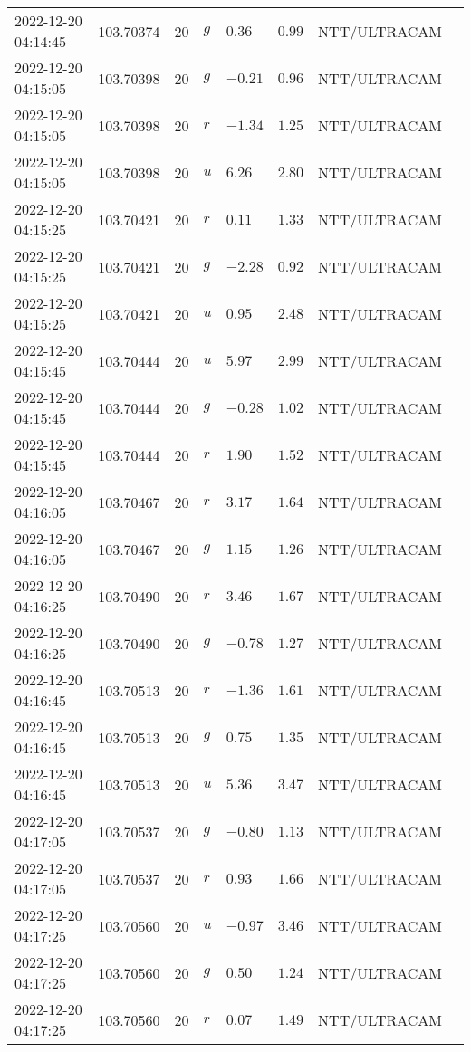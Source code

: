 \documentclass{nature_plusfigure}
\begin{document}
\begin{supplement}
\begin{center}
\begin{longtable}{llllllll}
2022-12-20 04:14:45 & 103.70374 & 20 & $g$ & $0.36$ & $0.99$ & NTT/ULTRACAM &  \\ 
2022-12-20 04:15:05 & 103.70398 & 20 & $g$ & $-0.21$ & $0.96$ & NTT/ULTRACAM &  \\ 
2022-12-20 04:15:05 & 103.70398 & 20 & $r$ & $-1.34$ & $1.25$ & NTT/ULTRACAM &  \\ 
2022-12-20 04:15:05 & 103.70398 & 20 & $u$ & $6.26$ & $2.80$ & NTT/ULTRACAM &  \\ 
2022-12-20 04:15:25 & 103.70421 & 20 & $r$ & $0.11$ & $1.33$ & NTT/ULTRACAM &  \\ 
2022-12-20 04:15:25 & 103.70421 & 20 & $g$ & $-2.28$ & $0.92$ & NTT/ULTRACAM &  \\ 
2022-12-20 04:15:25 & 103.70421 & 20 & $u$ & $0.95$ & $2.48$ & NTT/ULTRACAM &  \\ 
2022-12-20 04:15:45 & 103.70444 & 20 & $u$ & $5.97$ & $2.99$ & NTT/ULTRACAM &  \\ 
2022-12-20 04:15:45 & 103.70444 & 20 & $g$ & $-0.28$ & $1.02$ & NTT/ULTRACAM &  \\ 
2022-12-20 04:15:45 & 103.70444 & 20 & $r$ & $1.90$ & $1.52$ & NTT/ULTRACAM &  \\ 
2022-12-20 04:16:05 & 103.70467 & 20 & $r$ & $3.17$ & $1.64$ & NTT/ULTRACAM &  \\ 
2022-12-20 04:16:05 & 103.70467 & 20 & $g$ & $1.15$ & $1.26$ & NTT/ULTRACAM &  \\ 
2022-12-20 04:16:25 & 103.70490 & 20 & $r$ & $3.46$ & $1.67$ & NTT/ULTRACAM &  \\ 
2022-12-20 04:16:25 & 103.70490 & 20 & $g$ & $-0.78$ & $1.27$ & NTT/ULTRACAM &  \\ 
2022-12-20 04:16:45 & 103.70513 & 20 & $r$ & $-1.36$ & $1.61$ & NTT/ULTRACAM &  \\ 
2022-12-20 04:16:45 & 103.70513 & 20 & $g$ & $0.75$ & $1.35$ & NTT/ULTRACAM &  \\ 
2022-12-20 04:16:45 & 103.70513 & 20 & $u$ & $5.36$ & $3.47$ & NTT/ULTRACAM &  \\ 
2022-12-20 04:17:05 & 103.70537 & 20 & $g$ & $-0.80$ & $1.13$ & NTT/ULTRACAM &  \\ 
2022-12-20 04:17:05 & 103.70537 & 20 & $r$ & $0.93$ & $1.66$ & NTT/ULTRACAM &  \\ 
2022-12-20 04:17:25 & 103.70560 & 20 & $u$ & $-0.97$ & $3.46$ & NTT/ULTRACAM &  \\ 
2022-12-20 04:17:25 & 103.70560 & 20 & $g$ & $0.50$ & $1.24$ & NTT/ULTRACAM &  \\ 
2022-12-20 04:17:25 & 103.70560 & 20 & $r$ & $0.07$ & $1.49$ & NTT/ULTRACAM &  \\ 

\end{longtable}
\end{center}
\end{supplement}
\end{document}
